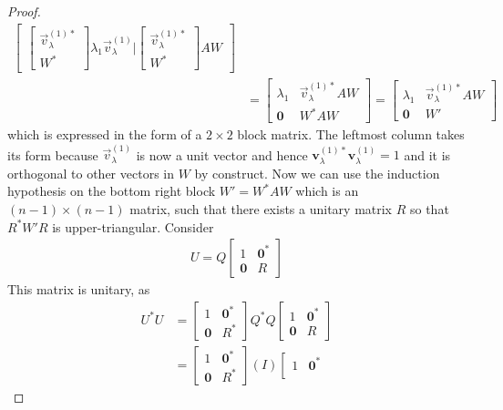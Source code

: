 \begin{proof}
\begin{align*}
\begin{bmatrix}
\begin{bmatrix}
\vec{v}_\lambda^{(1)*} \\
\hline
W^*
\end{bmatrix}\lambda_1\vec{v}_\lambda^{(1)} | 
\begin{bmatrix}
\vec{v}_\lambda^{(1)*} \\
\hline
W^*
\end{bmatrix}AW
\end{bmatrix} \\
&=
\left[\begin{array}{cc}
\lambda_1 & \vec{v}_\lambda^{(1)*}AW \\
\textbf{0} & W^*AW
\end{array}\right]
=
\left[\begin{array}{cc}
\lambda_1 & \vec{v}_\lambda^{(1)*}AW \\
\textbf{0} & W'
\end{array}\right]
\end{align*}
which is expressed in the form of a $2\times 2$ block matrix. The leftmost column takes its form because $\vec{v}_\lambda^{(1)}$ is now a unit vector and hence $\textbf{v}_\lambda^{(1)*} \textbf{v}_\lambda^{(1)} = 1$ and it is orthogonal to other vectors in $W$ by construct. Now we can use the induction hypothesis on the bottom right block $W' = W^*AW$ which is an $(n-1) \times (n-1)$ matrix, such that there exists a unitary matrix $R$ so that $R^*W'R$ is upper-triangular. Consider
\begin{align*}
U = 
Q 
\left[\begin{array}{cc}
1 & \textbf{0}^* \\
\textbf{0} & R
\end{array}\right]
\end{align*}
This matrix is unitary, as
\begin{align*}
U^*U &=  
\left[\begin{array}{cc}
1 & \textbf{0}^* \\
\textbf{0} & R^*
\end{array}\right]
Q^* Q 
\left[\begin{array}{cc}
1 & \textbf{0}^* \\
\textbf{0} & R
\end{array}\right] \\
&= \left[\begin{array}{cc}
1 & \textbf{0}^* \\
\textbf{0} & R^*
\end{array}\right]
(I)
\left[\begin{array}{cc}
1 & \textbf{0}^* \\

\end{array}
\end{align*}
\end{proof}
